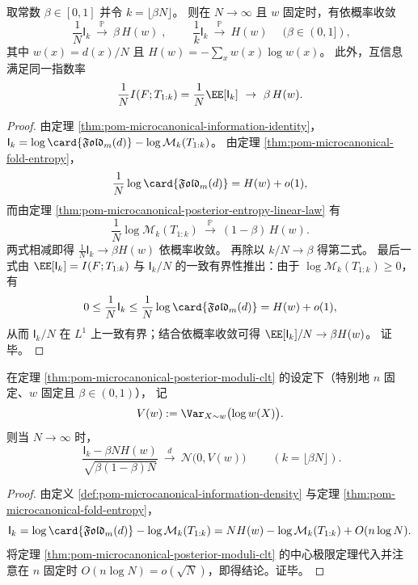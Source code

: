 \begin{theorem}\label{thm:pom-microcanonical-information-linear-law}
取常数 \(\beta\in[0,1]\) 并令 \(k=\lfloor\beta N\rfloor\)。
则在 \(N\to\infty\) 且 \(w\) 固定时，有依概率收敛
\[
\boxed{\;
\frac{1}{N}\mathsf{I}_k\ \xrightarrow{\ \mathbb{P}\ }\ \beta\,H(w)\;},
\qquad
\boxed{\;
\frac{1}{k}\mathsf{I}_k\ \xrightarrow{\ \mathbb{P}\ }\ H(w)\;}
\quad(\beta\in(0,1]),
\]
其中 \(w(x)=d(x)/N\) 且 \(H(w)=-\sum_x w(x)\log w(x)\)。
此外，互信息满足同一指数率
\[
\frac{1}{N}I(F;T_{1:k})=\frac{1}{N}\EE[\mathsf{I}_k]\ \to\ \beta\,H(w).
\]
\end{theorem}
\begin{proof}
由定理 \ref{thm:pom-microcanonical-information-identity}，
\(
\mathsf{I}_k=\log\card{\mathfrak{Fold}_m(d)}-\log\mathcal{M}_k(T_{1:k})
\)。
由定理 \ref{thm:pom-microcanonical-fold-entropy}，
\[
\frac{1}{N}\log\card{\mathfrak{Fold}_m(d)}=H(w)+o(1),
\]
而由定理 \ref{thm:pom-microcanonical-posterior-entropy-linear-law} 有
\[
\frac{1}{N}\log\mathcal{M}_k(T_{1:k})\ \xrightarrow{\ \mathbb{P}\ }\ (1-\beta)\,H(w).
\]
两式相减即得 \(\frac{1}{N}\mathsf{I}_k\to \beta H(w)\) 依概率收敛。
再除以 \(k/N\to\beta\) 得第二式。
最后一式由 \(\EE[\mathsf{I}_k]=I(F;T_{1:k})\) 与 \(\mathsf{I}_k/N\) 的一致有界性推出：由于 \(\log\mathcal{M}_k(T_{1:k})\ge 0\)，有
\[
0\le \frac{1}{N}\mathsf{I}_k\le \frac{1}{N}\log\card{\mathfrak{Fold}_m(d)}=H(w)+o(1),
\]
从而 \(\mathsf{I}_k/N\) 在 \(L^1\) 上一致有界；结合依概率收敛可得
\(
\EE[\mathsf{I}_k]/N\to \beta H(w)
\)。
证毕。
\end{proof}

\begin{corollary}[互信息涨落的中心极限定理]\label{cor:pom-microcanonical-information-clt}
在定理 \ref{thm:pom-microcanonical-posterior-moduli-clt} 的设定下（特别地 \(n\) 固定、\(w\) 固定且 \(\beta\in(0,1)\)），
记
\[
V(w):=\Var_{X\sim w}\bigl(\log w(X)\bigr).
\]
则当 \(N\to\infty\) 时，
\[
\boxed{\;
\frac{\mathsf{I}_k-\beta N H(w)}{\sqrt{\beta(1-\beta)N}}
\ \xrightarrow{d}\ \mathcal N\bigl(0,V(w)\bigr)\;}
\qquad\left(k=\lfloor\beta N\rfloor\right).
\]
\end{corollary}
\begin{proof}
由定义 \ref{def:pom-microcanonical-information-density} 与定理 \ref{thm:pom-microcanonical-fold-entropy}，
\[
\mathsf{I}_k
=\log\card{\mathfrak{Fold}_m(d)}-\log\mathcal{M}_k(T_{1:k})
=NH(w)-\log\mathcal{M}_k(T_{1:k})+O(n\log N).
\]
将定理 \ref{thm:pom-microcanonical-posterior-moduli-clt} 的中心极限定理代入并注意在 \(n\) 固定时 \(O(n\log N)=o(\sqrt N)\)，即得结论。证毕。
\end{proof}

